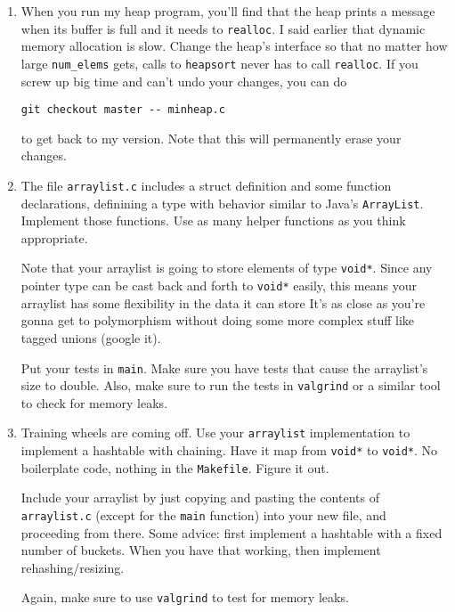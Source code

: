 \documentclass[ebook,11pt,oneside,openany]{memoir}
\newcommand{\cf}[1]{\texttt{#1}}
\begin{document}
\begin{enumerate}

\item When you run my heap program, you'll find that the heap prints a message when its buffer is full and it needs to \cf{realloc}. I said earlier that dynamic memory allocation is slow. Change the heap's interface so that no matter how large \cf{num\_elems} gets, calls to \cf{heapsort} never has to call \cf{realloc}. If you screw up big time and can't undo your changes, you can do

\begin{verbatim}
git checkout master -- minheap.c
\end{verbatim}

\noindent
to get back to my version. Note that this will permanently erase your changes.

\item The file \cf{arraylist.c} includes a struct definition and some function declarations, definining a type with behavior similar to Java's \cf{ArrayList}. Implement those functions. Use as many helper functions as you think appropriate.

Note that your arraylist is going to store elements of type \cf{void*}. Since any pointer type can be cast back and forth to \cf{void*} easily, this means your arraylist has some flexibility in the data it can store It's as close as you're gonna get to polymorphism without doing some more complex stuff like tagged unions (google it).

Put your tests in \cf{main}. Make sure you have tests that cause the arraylist's size to double. Also, make sure to run the tests in \cf{valgrind} or a similar tool to check for memory leaks.

\item Training wheels are coming off. Use your \cf{arraylist} implementation to implement a hashtable with chaining. Have it map from \cf{void*} to \cf{void*}. No boilerplate code, nothing in the \cf{Makefile}. Figure it out.

Include your arraylist by just copying and pasting the contents of \cf{arraylist.c} (except for the \cf{main} function) into your new file, and proceeding from there. Some advice: first implement a hashtable with a fixed number of buckets. When you have that working, then implement rehashing/resizing.

Again, make sure to use \cf{valgrind} to test for memory leaks.

\end{enumerate}
\end{document}

